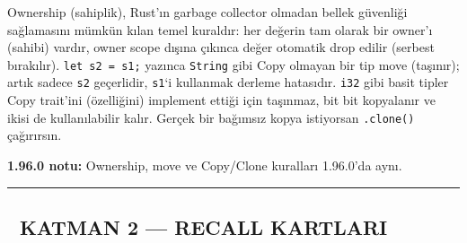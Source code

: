 \documentclass[12pt,a4paper]{article}
\begin{document}
Ownership (sahiplik), Rust'ın garbage collector olmadan bellek güvenliği sağlamasını mümkün kılan temel kuraldır: her değerin tam olarak bir owner'ı (sahibi) vardır, owner scope dışına çıkınca değer otomatik drop edilir (serbest bırakılır). \texttt{let\ s2\ =\ s1;} yazınca \texttt{String} gibi Copy olmayan bir tip move (taşınır); artık sadece \texttt{s2} geçerlidir, \texttt{s1}`i kullanmak derleme hatasıdır. \texttt{i32} gibi basit tipler Copy trait'ini (özelliğini) implement ettiği için taşınmaz, bit bit kopyalanır ve ikisi de kullanılabilir kalır. Gerçek bir bağımsız kopya istiyorsan \texttt{.clone()} çağırırsın.

\textbf{1.96.0 notu:} Ownership, move ve Copy/Clone kuralları 1.96.0'da aynı.

\begin{center}\rule{0.5\linewidth}{0.5pt}\end{center}

\subsection{🔵 KATMAN 2 --- RECALL KARTLARI}\label{katman-2-—-recall-kartlari-10}
\end{document}
